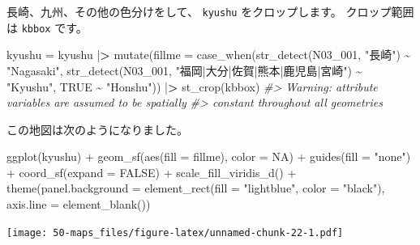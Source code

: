 \documentclass[
]{book}
\newenvironment{Shaded}{\begin{snugshade}}{\end{snugshade}}
\newcommand{\AttributeTok}[1]{\textcolor[rgb]{0.77,0.63,0.00}{#1}}
\newcommand{\CommentTok}[1]{\textcolor[rgb]{0.56,0.35,0.01}{\textit{#1}}}
\newcommand{\ConstantTok}[1]{\textcolor[rgb]{0.00,0.00,0.00}{#1}}
\newcommand{\ErrorTok}[1]{\textcolor[rgb]{0.64,0.00,0.00}{\textbf{#1}}}
\newcommand{\FunctionTok}[1]{\textcolor[rgb]{0.00,0.00,0.00}{#1}}
\newcommand{\NormalTok}[1]{#1}
\newcommand{\OtherTok}[1]{\textcolor[rgb]{0.56,0.35,0.01}{#1}}
\newcommand{\SpecialCharTok}[1]{\textcolor[rgb]{0.00,0.00,0.00}{#1}}
\newcommand{\StringTok}[1]{\textcolor[rgb]{0.31,0.60,0.02}{#1}}
\theoremstyle{definition}
\theoremstyle{definition}
\theoremstyle{definition}
\theoremstyle{definition}
\theoremstyle{remark}
\begin{document}
長崎、九州、その他の色分けをして、 \texttt{kyushu} をクロップします。
クロップ範囲は \texttt{kbbox} です。

\begin{Shaded}
\begin{Highlighting}[]
\NormalTok{kyushu }\OtherTok{=}\NormalTok{ kyushu }\SpecialCharTok{|}\ErrorTok{\textgreater{}}
  \FunctionTok{mutate}\NormalTok{(}\AttributeTok{fillme =} \FunctionTok{case\_when}\NormalTok{(}\FunctionTok{str\_detect}\NormalTok{(N03\_001, }\StringTok{"長崎"}\NormalTok{) }\SpecialCharTok{\textasciitilde{}} \StringTok{"Nagasaki"}\NormalTok{,}
                            \FunctionTok{str\_detect}\NormalTok{(N03\_001, }\StringTok{"福岡|大分|佐賀|熊本|鹿児島|宮崎"}\NormalTok{) }\SpecialCharTok{\textasciitilde{}} \StringTok{"Kyushu"}\NormalTok{,}
                            \ConstantTok{TRUE} \SpecialCharTok{\textasciitilde{}} \StringTok{"Honshu"}\NormalTok{)) }\SpecialCharTok{|}\ErrorTok{\textgreater{}} 
  \FunctionTok{st\_crop}\NormalTok{(kbbox)}
\CommentTok{\#\textgreater{} Warning: attribute variables are assumed to be spatially}
\CommentTok{\#\textgreater{} constant throughout all geometries}
\end{Highlighting}
\end{Shaded}

この地図は次のようになりました。

\begin{Shaded}
\begin{Highlighting}[]
\FunctionTok{ggplot}\NormalTok{(kyushu) }\SpecialCharTok{+} 
  \FunctionTok{geom\_sf}\NormalTok{(}\FunctionTok{aes}\NormalTok{(}\AttributeTok{fill =}\NormalTok{ fillme), }\AttributeTok{color =} \ConstantTok{NA}\NormalTok{) }\SpecialCharTok{+}
  \FunctionTok{guides}\NormalTok{(}\AttributeTok{fill =} \StringTok{"none"}\NormalTok{) }\SpecialCharTok{+}
  \FunctionTok{coord\_sf}\NormalTok{(}\AttributeTok{expand =} \ConstantTok{FALSE}\NormalTok{) }\SpecialCharTok{+}
  \FunctionTok{scale\_fill\_viridis\_d}\NormalTok{() }\SpecialCharTok{+}
  \FunctionTok{theme}\NormalTok{(}\AttributeTok{panel.background =} \FunctionTok{element\_rect}\NormalTok{(}\AttributeTok{fill =} \StringTok{"lightblue"}\NormalTok{, }\AttributeTok{color =} \StringTok{"black"}\NormalTok{),}
        \AttributeTok{axis.line =} \FunctionTok{element\_blank}\NormalTok{())}
\end{Highlighting}
\end{Shaded}

\texttt{[image: 50-maps\_files/figure-latex/unnamed-chunk-22-1.pdf]}
\end{document}
